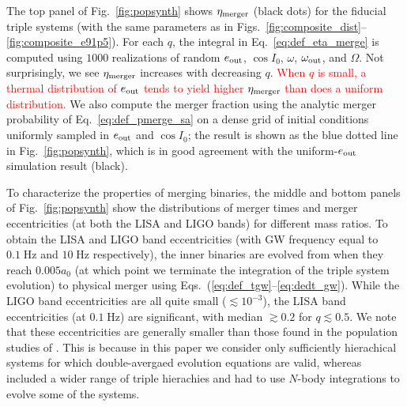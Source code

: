 \documentclass[
        fleqn,
        usenatbib,
    ]{mnras}
\begin{document}
The top panel of Fig.~\ref{fig:popsynth} shows $\eta_{\rm merger}$ (black
dots) for the fiducial triple systems (with the same parameters as in
Figs.~\ref{fig:composite_dist}--\ref{fig:composite_e91p5}). For each $q$, the
integral in Eq.~\eqref{eq:def_eta_merge} is computed using $1000$ realizations
of random $e_{\rm out}$, $\cos I_0$, $\omega$, $\omega_{\rm out}$, and
$\Omega$. Not surprisingly, we see $\eta_{\rm merger}$ increases with decreasing
$q$. \textcolor{red}{When $q$ is small, a thermal distribution of $e_{\rm out}$
tends to yield higher $\eta_{\rm merger}$ than does a uniform distribution.}
We also compute the merger fraction using the analytic merger probability of
Eq.~\eqref{eq:def_pmerge_sa} on a dense grid of initial conditions uniformly
sampled in $e_{\rm out}$ and $\cos I_0$; the result is shown as the blue dotted
line in Fig.~\ref{fig:popsynth}, which is in good agreement with the uniform-$e_{\rm out}$ simulation
result (black).

To characterize the properties of merging binaries, the middle and bottom panels
of Fig.~\ref{fig:popsynth} show the distributions of merger times and merger
eccentricities (at both the LISA and LIGO bands) for different mass ratios. To
obtain the LISA and LIGO band eccentricities (with GW frequency equal to
$0.1\;\mathrm{Hz}$ and $10\;\mathrm{Hz}$ respectively), the inner binaries are
evolved from when they reach $0.005 a_0$ (at which point we terminate the
integration of the triple system evolution) to physical merger using
Eqs.~(\ref{eq:def_tgw}--\ref{eq:dedt_gw}). While the LIGO band eccentricities
are all quite small ($\lesssim 10^{-3}$), the LISA band eccentricities (at $0.1
\;\mathrm{Hz}$) are significant, with median $\gtrsim 0.2$ for $q\lesssim 0.5$.
We note that these eccentricities are generally smaller than those found in the
population studies of \citet{LL19}. This is because in this paper we consider
only sufficiently hierachical systems for which double-avergaed evolution
equations are valid, whereas \citet{LL19} included a wider range of triple
hierachies and had to use $N$-body integrations to evolve some of the systems.
\end{document}
